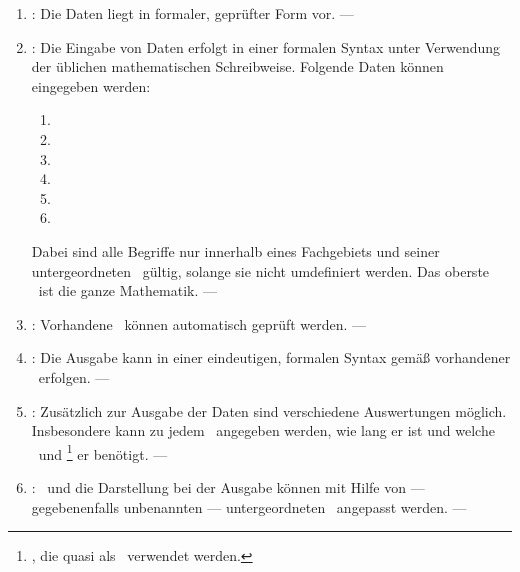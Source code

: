 %
\begin{enumerate}

	\item \label{Anforderung-Form} :
	Die Daten liegt in formaler, geprüfter Form vor.
	--- 

	\item \label{Anforderung-Eingaben} :
	Die Eingabe von Daten erfolgt in einer formalen Syntax unter Verwendung der üblichen mathematischen Schreibweise.
	Folgende Daten können eingegeben werden:
	\begin{enumerate}
		\item \Axiome
		\item \Saetze
		\item \Beweise
		\item \Fachbegriffe
		\item \Fachgebiete
		\item \Ausgabeschemata
	\end{enumerate}
	Dabei sind alle Begriffe nur innerhalb eines Fachgebiets und seiner untergeordneten \Fachgebiete\ gültig, solange sie nicht umdefiniert werden.
	Das oberste \Fachgebiet\ ist die ganze Mathematik.
	--- 

	\item \label{Anforderung-Pruefung} :
	Vorhandene \Beweise\ können automatisch geprüft werden.
	--- 

	\item \label{Anforderung-Ausgaben} :
	Die Ausgabe kann in einer eindeutigen, formalen Syntax gemäß vorhandener \Ausgabeschemata\ erfolgen.
	--- 

	\item \label{Anforderung-Auswertungen} :
	Zusätzlich zur Ausgabe der Daten sind verschiedene Auswertungen möglich.
	Insbesondere kann zu jedem \Beweis\ angegeben werden, wie lang er ist und welche \Axiome\ und \Saetze%
	\footnote{\Saetze, die quasi als \Axiome\ verwendet werden.}
	er benötigt.
	--- 

	\item \label{Anforderung-Anpassbarkeit} :
	\Fachbegriffe\ und die Darstellung bei der Ausgabe können mit Hilfe von --- gegebenenfalls unbenannten --- untergeordneten \Fachgebieten\ angepasst werden.
	--- 


\end{enumerate}
